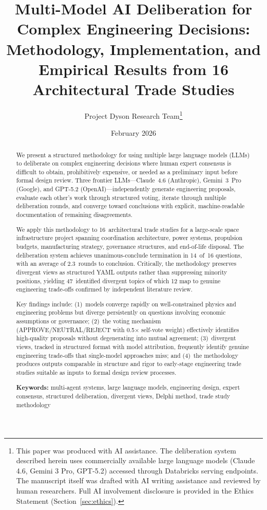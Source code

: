 \documentclass[11pt,a4paper]{article}
\title{\textbf{Multi-Model AI Deliberation for Complex Engineering Decisions: Methodology, Implementation, and Empirical Results from 16 Architectural Trade Studies}}
\author{Project Dyson Research Team\thanks{This paper was produced with AI assistance. The deliberation system described herein uses commercially available large language models (Claude 4.6, Gemini 3 Pro, GPT-5.2) accessed through Databricks serving endpoints. The manuscript itself was drafted with AI writing assistance and reviewed by human researchers. Full AI involvement disclosure is provided in the Ethics Statement (Section~\ref{sec:ethics}).}}
\affil{Project Dyson --- Open-Source Space Infrastructure Initiative\\ \texttt{https://projectdyson.org}}
\date{February 2026}
\begin{document}
\maketitle

\begin{abstract}
We present a structured methodology for using multiple large language models (LLMs) to deliberate on complex engineering decisions where human expert consensus is difficult to obtain, prohibitively expensive, or needed as a preliminary input before formal design review. Three frontier LLMs---Claude~4.6 (Anthropic), Gemini~3~Pro (Google), and GPT-5.2 (OpenAI)---independently generate engineering proposals, evaluate each other's work through structured voting, iterate through multiple deliberation rounds, and converge toward conclusions with explicit, machine-readable documentation of remaining disagreements.

We apply this methodology to 16~architectural trade studies for a large-scale space infrastructure project spanning coordination architecture, power systems, propulsion budgets, manufacturing strategy, governance structures, and end-of-life disposal. The deliberation system achieves unanimous-conclude termination in 14~of~16 questions, with an average of 2.3~rounds to conclusion. Critically, the methodology preserves divergent views as structured YAML outputs rather than suppressing minority positions, yielding 47~identified divergent topics of which 12 map to genuine engineering trade-offs confirmed by independent literature review.

Key findings include: (1)~models converge rapidly on well-constrained physics and engineering problems but diverge persistently on questions involving economic assumptions or governance; (2)~the voting mechanism (APPROVE/NEUTRAL/REJECT with 0.5$\times$ self-vote weight) effectively identifies high-quality proposals without degenerating into mutual agreement; (3)~divergent views, tracked in structured format with model attribution, frequently identify genuine engineering trade-offs that single-model approaches miss; and (4)~the methodology produces outputs comparable in structure and rigor to early-stage engineering trade studies suitable as inputs to formal design review processes.

\medskip
\noindent\textbf{Keywords:} multi-agent systems, large language models, engineering design, expert consensus, structured deliberation, divergent views, Delphi method, trade study methodology
\end{abstract}
\end{document}
